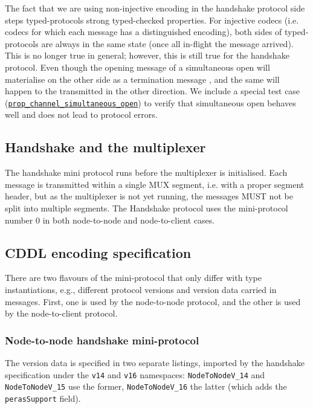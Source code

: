 The fact that we are using non-injective encoding in the handshake protocol
side steps typed-protocols strong typed-checked properties.  For injective
codecs (i.e. codecs for which each message has a distinguished encoding), both
sides of typed-protocols are always in the same state (once all in-flight
the message arrived).  This is no longer true in general; however, this is still
true for the handshake protocol.  Even though the opening message
\MsgProposeVersions{} of a simultaneous open will materialise on the
other side as a termination message \MsgReplyVersions{}, and the same will
happen to the \MsgProposeVersions{} transmitted in the other direction.
We include a special test case
(\href{https://ouroboros-network.cardano.intersectmbo.org/ouroboros-network/protocols-tests-lib/Ouroboros-Network-Protocol-Handshake-Test.html\#v:prop\_channel\_simultaneous\_open}{\texttt{prop\_channel\_simultaneous\_open}})
to verify that simultaneous open behaves well and does not lead to protocol
errors.

\subsection{Handshake and the multiplexer}

The handshake mini protocol runs before the multiplexer is initialised.
Each message is transmitted within a single MUX segment, i.e. with a proper
segment header, but as the multiplexer is not yet running, the messages MUST not
be split into multiple segments.  The Handshake protocol uses the
mini-protocol number $0$ in both node-to-node and node-to-client cases.

\subsection{CDDL encoding specification}\label{handshake-cddl}
There are two flavours of the mini-protocol that only differ with type
instantiations, e.g., different protocol versions and version data carried in
messages.  First, one is used by the node-to-node protocol, and the other is used by the
node-to-client protocol.
\subsubsection{Node-to-node handshake mini-protocol}
The version data is specified in two separate listings, imported by the
handshake specification under the \texttt{v14} and \texttt{v16} namespaces:
\texttt{NodeToNodeV\_14} and \texttt{NodeToNodeV\_15} use the former,
\texttt{NodeToNodeV\_16} the latter (which adds the \texttt{perasSupport}
field).




